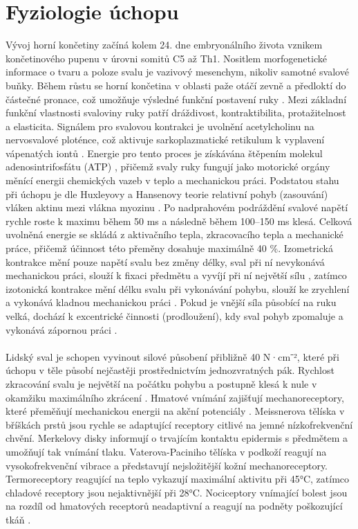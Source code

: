 \section{Fyziologie úchopu}

Vývoj horní končetiny začíná kolem 24. dne embryonálního života vznikem končetinového pupenu v úrovni somitů C5 až Th1. Nositlem morfogenetické informace o tvaru a poloze svalu je vazivový mesenchym, nikoliv samotné svalové buňky. Během růstu se horní končetina v oblasti paže otáčí zevně a předloktí do částečné pronace, což umožňuje výsledné funkční postavení ruky \cite{Cihak2011}. Mezi základní funkční vlastnosti svaloviny ruky patří dráždivost, kontraktibilita, protažitelnost a elasticita. Signálem pro svalovou kontrakci je uvolnění acetylcholinu na nervosvalové ploténce, což aktivuje sarkoplazmatické retikulum k vyplavení vápenatých iontů \cite{Stuchla2024}. Energie pro tento proces je získávána štěpením molekul adenosintrifosfátu (ATP) \cite{Cihak2011}, přičemž svaly ruky fungují jako motorické orgány měnící energii chemických vazeb v teplo a mechanickou práci. Podstatou stahu při úchopu je dle Huxleyovy a Hansenovy teorie relativní pohyb (zasouvání) vláken aktinu mezi vlákna myozinu \cite{Benes2022}.
Po nadprahovém podráždění svalové napětí rychle roste k maximu během 50 ms a následně během 100–150 ms klesá. Celková uvolněná energie se skládá z aktivačního tepla, zkracovacího tepla a mechanické práce, přičemž účinnost této přeměny dosahuje maximálně 40 \%. Izometrická kontrakce mění pouze napětí svalu bez změny délky, sval při ní nevykonává mechanickou práci, slouží k fixaci předmětu a vyvíjí při ní největší sílu \cite{Benes2022}, zatímco izotonická kontrakce mění délku svalu při vykonávání pohybu, slouží ke zrychlení a vykonává kladnou mechanickou práci \cite{Benes2022, Stuchla2024}. Pokud je vnější síla působící na ruku velká, dochází k excentrické činnosti (prodloužení), kdy sval pohyb zpomaluje a vykonává zápornou práci \cite{Benes2022}.
\paragraph{}Lidský sval je schopen vyvinout silové působení přibližně 40 N·cm⁻², které při úchopu v těle působí nejčastěji prostřednictvím jednozvratných pák. Rychlost zkracování svalu je největší na počátku pohybu a postupně klesá k nule v okamžiku maximálního zkrácení \cite{Benes2022}. Hmatové vnímání zajišťují mechanoreceptory, které přeměňují mechanickou energii na akční potenciály \cite{Cihak2016}. Meissnerova tělíska v bříškách prstů jsou rychle se adaptující receptory citlivé na jemné nízkofrekvenční chvění. Merkelovy disky informují o trvajícím kontaktu epidermis s předmětem a umožňují tak vnímání tlaku. Vaterova-Paciniho tělíska v podkoží reagují na vysokofrekvenční vibrace a představují nejsložitější kožní mechanoreceptory. Termoreceptory reagující na teplo vykazují maximální aktivitu při 45°C, zatímco chladové receptory jsou nejaktivnější při 28°C. Nociceptory vnímající bolest jsou na rozdíl od hmatových receptorů neadaptivní a reagují na podněty poškozující tkáň \cite{Stuchla2024}.
